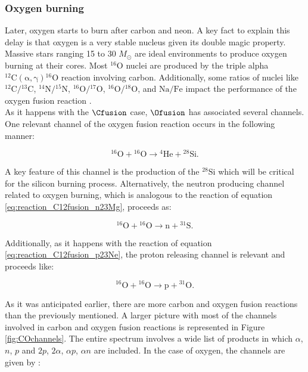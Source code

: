 \documentclass[openany]{book}
\begin{document}
\subsubsection{Oxygen burning}\label{ssub:reactions_oxygenBurning}

Later, oxygen starts to burn after carbon and neon. A key fact to explain this delay is that oxygen is a very stable nucleus given its double magic property. Massive stars ranging 15 to 30 $M_{\odot}$ are ideal environments to produce oxygen burning at their cores. Most $\mathrm{{}^{16}O}$ nuclei are produced by the triple alpha $\mathrm{{}^{12}C(\alpha, \gamma){}^{16}O}$ reaction involving carbon. Additionally, some ratios of nuclei like  $\mathrm{{}^{12}C/{}^{13}C}$, $\mathrm{{}^{14}N/{}^{15}N}$, $\mathrm{{}^{16}O/{}^{17}O}$,  $\mathrm{{}^{16}O/{}^{18}O}$, and $\mathrm{Na/Fe}$ impact the performance of the oxygen fusion reaction \cite{eleid_meyer_the_2004}. \\

As it happens with the $\Cfusion$ case, $\Ofusion$ has associated several channels. One relevant channel of the oxygen fusion reaction occurs in the following manner:

\begin{equation} \label{eq:reaction_O16fusion_alpha28Si}
	\mathrm{{}^{16}O + {}^{16}O \rightarrow {}^{4}He + {}^{28}Si}. 
\end{equation}

A key feature of this channel is the production of the $\mathrm{{}^{28}Si}$ which will be critical for the silicon burning process. Alternatively, the neutron producing channel related to oxygen burning, which is analogous to the reaction of equation \ref{eq:reaction_C12fusion_n23Mg}, proceeds as: 

\begin{equation} \label{eq:reaction_O16fusion_n31S}
	\mathrm{{}^{16}O + {}^{16}O \rightarrow n + {}^{31}S}. 
\end{equation}

Additionally, as it happens with the reaction of equation \ref{eq:reaction_C12fusion_p23Ne}, the proton releasing channel is relevant and proceeds like: 

\begin{equation} \label{eq:reaction_O16fusion_p31P}
	\mathrm{{}^{16}O + {}^{16}O \rightarrow p + {}^{31}O}. 
\end{equation}

As it was anticipated earlier, there are more carbon and oxygen fusion reactions than the previously mentioned. A larger picture with most of the channels involved in carbon and oxygen fusion reactions is represented in Figure \ref{fig:COchannels}. The entire spectrum involves a wide list of products in which $\alpha$, $n$, $p$ and $2p$, $2\alpha$, $\alpha p$, $\alpha n$ are included. In the case of oxygen, the channels are given by \cite{kuronen_keinonen_tikkanen_1987}:  
\end{document}
